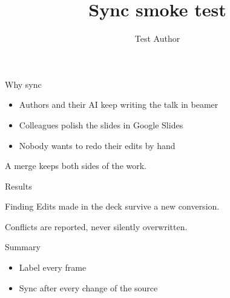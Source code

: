 \documentclass{beamer}
\title{Sync smoke test}
\author{Test Author}
\begin{document}
\begin{frame}[label=intro]{Why sync}
  \begin{itemize}
    \item Authors and their AI keep writing the talk in beamer
    \item Colleagues polish the slides in Google Slides
    \item Nobody wants to redo their edits by hand
  \end{itemize}
  \vspace{1em}
  A merge keeps both sides of the work.
\end{frame}

\begin{frame}[label=results]{Results}
  \begin{block}{Finding}
    Edits made in the deck survive a new conversion.
  \end{block}
  \vspace{1em}
  Conflicts are reported, never silently overwritten.
\end{frame}

\begin{frame}[label=end]{Summary}
  \begin{itemize}
    \item Label every frame
    \item Sync after every change of the source
  \end{itemize}
\end{frame}
\end{document}
